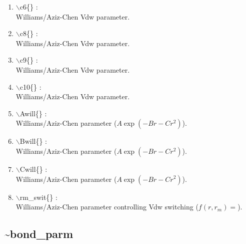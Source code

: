 \documentclass[12pt]{article}
\begin{document}
\begin{enumerate}
 \vspace{0.15in} 
 \item  $\backslash$c6\{\} : \\ 
    Williams/Aziz-Chen Vdw parameter.

 \vspace{0.15in} 
 \item  $\backslash$c8\{\} : \\ 
    Williams/Aziz-Chen Vdw parameter.

 \vspace{0.15in} 
 \item  $\backslash$c9\{\} : \\ 
    Williams/Aziz-Chen Vdw parameter.

 \vspace{0.15in} 
 \item  $\backslash$c10\{\} : \\ 
    Williams/Aziz-Chen Vdw parameter.

 \vspace{0.15in} 
 \item  $\backslash$Awill\{\} : \\ 
    Williams/Aziz-Chen parameter ($A\exp(-Br-Cr^2)$).

 \vspace{0.15in} 
 \item  $\backslash$Bwill\{\} : \\ 
    Williams/Aziz-Chen parameter ($A\exp(-Br-Cr^2)$).

 \vspace{0.15in} 
 \item  $\backslash$Cwill\{\} : \\ 
    Williams/Aziz-Chen parameter ($A\exp(-Br-Cr^2)$).

 \vspace{0.15in} 
 \item  $\backslash$rm\_swit\{\} : \\ 
    Williams/Aziz-Chen parameter controlling Vdw switching 
   ($f(r,r_m) = $).

\end{enumerate}

\newpage
\subsection*{\bf \~{}bond\_parm}
\end{document}
